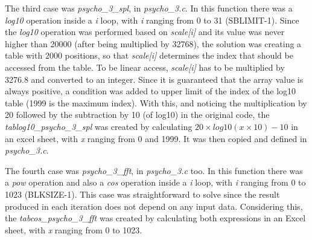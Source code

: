 \documentclass{article}
\begin{document}
\begin{comment}
\begin{figure}[H]
\centerline{\fbox{\texttt{[image: init.pdf]}}}
\caption{\textit{psycho\_3\_init\_add\_db} function.}
\label{init}
\end{figure}
\end{comment}


The third case was \textit{psycho\_3\_spl}, in \textit{psycho\_3.c}. In this function there was a \textit{log10} operation inside a \textit{i} loop, with \textit{i} ranging from 0 to 31 (SBLIMIT-1). Since the \textit{log10} operation was performed based on \textit{scale[i]} and its value was never higher than 20000 (after being multiplied by 32768), the solution was creating a table with 2000 positions, so that \textit{scale[i]} determines the index that should be accessed from the table. 
To be linear access, \textit{scale[i]} has to be multiplied by 3276.8 and converted to an integer. Since it is guaranteed that the array value is always positive, a condition was added to upper limit of the index of the log10 table (1999 is the maximum index). With this, and noticing the multiplication by 20 followed by the subtraction by 10 (of log10) in the original code, the \textit{tablog10\_psycho\_3\_spl} was created by calculating $20\times log10(x\times 10)-10$ in an excel sheet, with \textit{x} ranging from 0 and 1999. It was then copied and defined in \textit{psycho\_3.c}.

\begin{comment}
\begin{figure}[H]
\centerline{\fbox{\texttt{[image: spl.pdf]}}}
\caption{\textit{psycho\_3\_spl} function.}
\label{spl}
\end{figure}

\vspace{1cm}
\end{comment}

The fourth case was \textit{psycho\_3\_fft}, in \textit{psycho\_3.c} too. In this function there was a \textit{pow} operation and also a \textit{cos} operation inside a \textit{i} loop, with \textit{i} ranging from 0 to 1023 (BLKSIZE-1). This case was straightforward to solve since the result produced in each iteration does not depend on any input data. Considering this, the \textit{tabcos\_psycho\_3\_fft} was created by calculating both expressions in an Excel sheet, with \textit{x} ranging from 0 to 1023.
\end{document}
